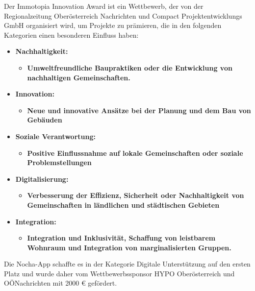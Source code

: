 Der Immotopia Innovation Award ist ein Wettbewerb, der von der Regionalzeitung Oberösterreich Nachrichten und Compact Projektentwicklungs GmbH organisiert wird, um Projekte zu prämieren, die in den folgenden Kategorien einen besonderen Einfluss haben:

\begin{itemize}
    \item \textbf{Nachhaltigkeit:}
          \begin{itemize}
              \item \textbf{Umweltfreundliche Baupraktiken oder die Entwicklung von nachhaltigen Gemeinschaften.}
          \end{itemize}
    \item \textbf{Innovation:}
          \begin{itemize}
              \item \textbf{Neue und innovative Ansätze bei der Planung und dem Bau von Gebäuden}
          \end{itemize}
    \item \textbf{Soziale Verantwortung:}
          \begin{itemize}
              \item \textbf{Positive Einflussnahme auf lokale Gemeinschaften oder soziale Problemstellungen}
          \end{itemize}
    \item \textbf{Digitalisierung:}
          \begin{itemize}
              \item \textbf{Verbesserung der Effizienz, Sicherheit oder Nachhaltigkeit von Gemeinschaften in ländlichen und städtischen Gebieten}
          \end{itemize}
    \item \textbf{Integration:}
          \begin{itemize}
              \item \textbf{Integration und Inklusivität, Schaffung von leistbarem Wohnraum und Integration von marginalisierten Gruppen.}
          \end{itemize}
\end{itemize}

Die Nocha-App schaffte es in der Kategorie Digitale Unterstützung auf den ersten Platz und wurde daher vom Wettbewerbssponsor HYPO Oberösterreich und OÖNachrichten mit 2000 € gefördert.

